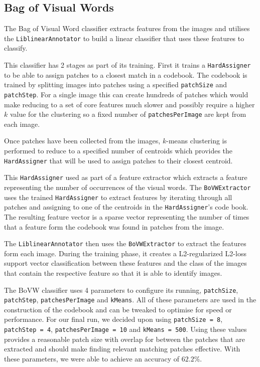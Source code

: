 \documentclass[paper=a4, fontsize=11pt]{article}
\begin{document}
\subsection{Bag of Visual Words}

The Bag of Visual Word classifier extracts features from the images and utilises the \texttt{LiblinearAnnotator} to build a linear classifier that uses these features to classify.

This classifier has 2 stages as part of its training. First it trains a \texttt{HardAssigner} to be able to assign patches to a closest match in a codebook. The codebook is trained by splitting images into patches using a specified  \texttt{patchSize} and \texttt{patchStep}. For a single image this can create hundreds of patches which would make reducing to a set of core features much slower and possibly require a higher $k$ value for the clustering so a fixed number of \texttt{patchesPerImage} are kept from each image. 

Once patches have been collected from the images, $k$-means clustering is performed to reduce to a specified number of centroids which provides the \texttt{HardAssigner} that will be used to assign patches to their closest centroid.

This \texttt{HardAssigner} used as part of a feature extractor which extracts a feature representing the number of occurrences of the visual words. The \texttt{BoVWExtractor} uses the trained \texttt{HardAssigner} to extract features by iterating through all patches and assigning to one of the centroids in the \texttt{HardAssigner}'s code book. The resulting feature vector is a sparse vector representing the number of times that a feature form the codebook was found in patches from the image.

The \texttt{LiblinearAnnotator} then uses the \texttt{BoVWExtractor} to extract the features form each image. During the training phase, it creates a L2-regularized L2-loss support vector classification between these features and the class of the images that contain the respective feature so that it is able to identify images.

The BoVW classifier uses 4 parameters to configure its running, \texttt{patchSize}, \texttt{patchStep}, \texttt{patchesPerImage} and \texttt{kMeans}. All of these parameters are used in the construction of the codebook and can be tweaked to optimise for speed or performance. For our final run, we decided upon using \texttt{patchSize = 8}, \texttt{patchStep = 4}, \texttt{patchesPerImage = 10} and \texttt{kMeans = 500}. Using these values provides a reasonable patch size with overlap for between the patches that are extracted and should make finding relevant matching patches effective. With these parameters, we were able to achieve an accuracy of $62.2\%$.
\end{document}
